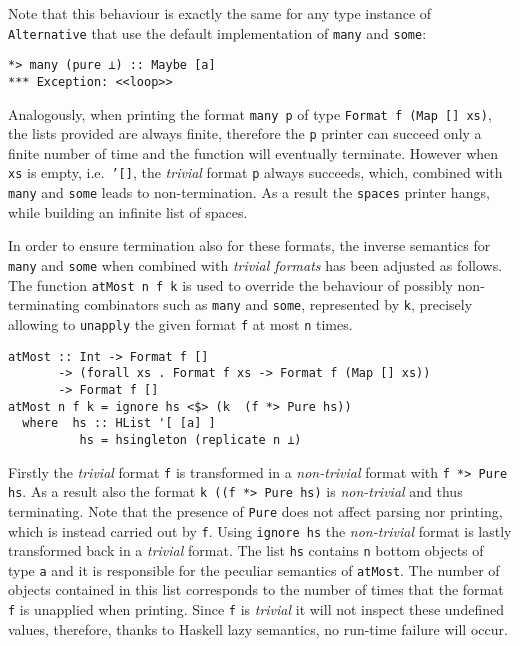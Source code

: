 \documentclass[../Thesis.tex]{subfiles}
\begin{document}
Note that this behaviour is exactly the same for any type
instance of \texttt{Alternative} that use the default implementation
of \texttt{many} and \texttt{some}:
\begin{verbatim}
*> many (pure ⊥) :: Maybe [a]
*** Exception: <<loop>>
\end{verbatim}

Analogously, when printing the format \texttt{many p} of type \texttt{Format f (Map [] xs)}, the lists provided are always finite, therefore the \texttt{p} printer can succeed only a finite number of time and the function will eventually terminate.
However when \texttt{xs} is empty, i.e.\ \texttt{'[]}, the \emph{trivial} format \texttt{p} always succeeds, which, combined with \texttt{many} and \texttt{some} leads to non-termination.
As a result the \texttt{spaces} printer hangs, while building an infinite list of spaces.

In order to ensure termination also for these formats, the inverse 
semantics for \texttt{many} and \texttt{some} when combined with \emph{trivial formats} has been adjusted as follows. 
The function \texttt{atMost n f k} is used to override the behaviour of
possibly non-terminating combinators such as \texttt{many} and \texttt{some}, represented by \texttt{k}, precisely allowing to \texttt{unapply} the given format \texttt{f} at most \texttt{n} times.

\begin{verbatim}
atMost :: Int -> Format f [] 
       -> (forall xs . Format f xs -> Format f (Map [] xs))
       -> Format f []
atMost n f k = ignore hs <$> (k  (f *> Pure hs))
  where  hs :: HList '[ [a] ]    
          hs = hsingleton (replicate n ⊥)
\end{verbatim}

Firstly the \emph{trivial} format \texttt{f} is transformed in a \emph{non-trivial} format with \texttt{f *> Pure hs}. As a result also the format \texttt{k ((f *> Pure hs)} is \emph{non-trivial} and thus terminating.
Note that the presence of \texttt{Pure} does not affect parsing nor printing, which is instead carried out by \texttt{f}. Using \texttt{ignore hs} the \emph{non-trivial} format is lastly transformed back in a \emph{trivial} format.
The list \texttt{hs} contains \texttt{n} bottom objects of type \texttt{a} and it
is responsible for the peculiar semantics of \texttt{atMost}.
The number of objects contained in this list corresponds to the number of times that the format \texttt{f} is unapplied when printing. Since \texttt{f} is \emph{trivial} it will not inspect these undefined values, therefore, thanks
to Haskell lazy semantics, no run-time failure will occur.
\end{document}
